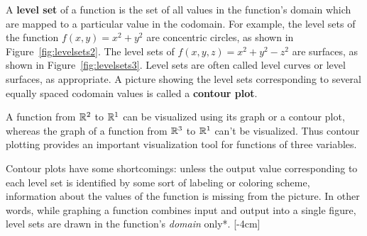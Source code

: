 \documentclass{watsonbook}
\begin{document}
A \textbf{level set} of a function is the set of all values in the
function's domain which are mapped to a particular value in the
codomain. For example, the level sets of the function
$f(x,y) = x^2 + y^2$ are concentric circles, as shown in
Figure~\ref{fig:levelsets2}. The level sets of
$f(x,y,z) = x^2 + y^2 - z^2$ are surfaces, as shown in
Figure~\ref{fig:levelsets3}. Level sets are often called level curves
or level surfaces, as appropriate. A picture showing the level sets
corresponding to several equally spaced codomain values is called a
\textbf{contour plot}. 

A function from $\mathbb{R}^2$ to $\mathbb{R}^1$ can be visualized using its graph or
a contour plot, whereas the graph of a function from $\mathbb{R}^3$ to $\mathbb{R}^1$
can't be visualized. Thus contour plotting provides an important
visualization tool for functions of three variables.

Contour plots have some shortcomings: unless the output value
corresponding to each level set is identified by some sort of labeling
or coloring scheme, information about the values of the function is
missing from the picture. In other words, while graphing a function
combines input and output into a single figure, level sets are drawn
in the function's \textit{domain} only*. [-4cm]
\end{document}
